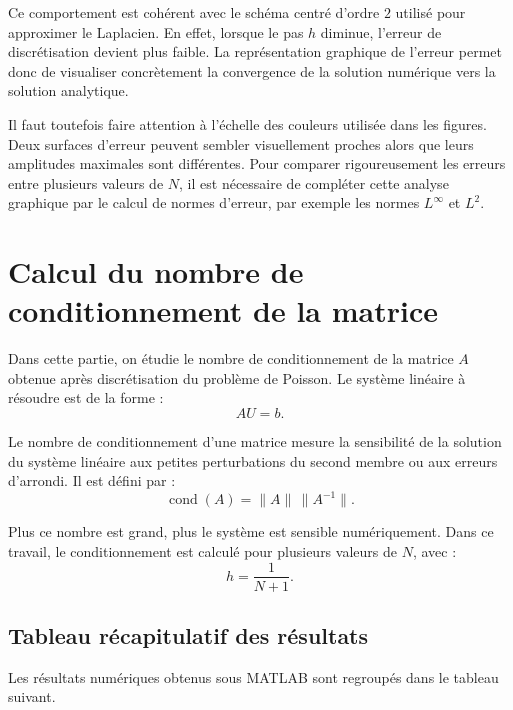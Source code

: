 \documentclass[12pt,a4paper]{article}
\begin{document}
Ce comportement est cohérent avec le schéma centré d'ordre $2$ utilisé pour
approximer le Laplacien. En effet, lorsque le pas $h$ diminue, l'erreur de
discrétisation devient plus faible. La représentation graphique de l'erreur
permet donc de visualiser concrètement la convergence de la solution numérique
vers la solution analytique.

Il faut toutefois faire attention à l'échelle des couleurs utilisée dans les
figures. Deux surfaces d'erreur peuvent sembler visuellement proches alors que
leurs amplitudes maximales sont différentes. Pour comparer rigoureusement les
erreurs entre plusieurs valeurs de $N$, il est nécessaire de compléter cette
analyse graphique par le calcul de normes d'erreur, par exemple les normes
$L^\infty$ et $L^2$.




\section{Calcul du nombre de conditionnement de la matrice}

Dans cette partie, on étudie le nombre de conditionnement de la matrice $A$
obtenue après discrétisation du problème de Poisson. Le système linéaire à
résoudre est de la forme :
\[
AU=b.
\]

Le nombre de conditionnement d'une matrice mesure la sensibilité de la solution
du système linéaire aux petites perturbations du second membre ou aux erreurs
d'arrondi. Il est défini par :
\[
\operatorname{cond}(A)=\|A\|\,\|A^{-1}\|.
\]

Plus ce nombre est grand, plus le système est sensible numériquement. Dans ce
travail, le conditionnement est calculé pour plusieurs valeurs de $N$, avec :
\[
h=\frac{1}{N+1}.
\]

\subsection{Tableau récapitulatif des résultats}

Les résultats numériques obtenus sous MATLAB sont regroupés dans le tableau
suivant.
\end{document}
